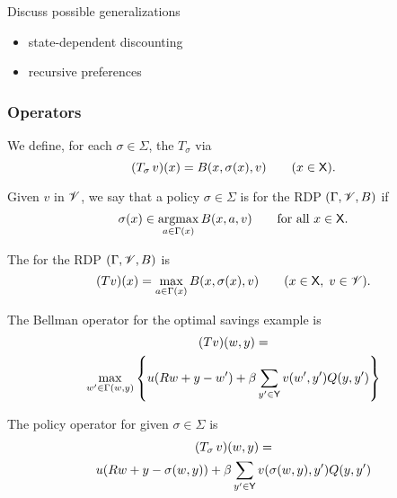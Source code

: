 \begin{frame}
    
    Discuss possible generalizations

    \begin{itemize}
        \item state-dependent discounting
        \item recursive preferences
    \end{itemize}
     
\end{frame}


\begin{frame}
    \frametitle{Operators}

    We define, for each $\sigma \in \Sigma$, the 
    $T_\sigma$ via
    \begin{equation*}
        (T_\sigma \, v)(x) = B(x, \sigma(x), v)
        \qquad (x \in \mathsf X).
    \end{equation*}


    Given $v$ in $\mathscr V$, we say that a policy $\sigma \in \Sigma$ is
     for the RDP $(\Gamma, \mathscr V, B)$ if 
    \begin{equation*}
        \sigma(x) \in \argmax_{a \in \Gamma(x)} B(x, a, v)
        \qquad \text{for all } x \in \Xsf.
    \end{equation*}

    The  for the RDP $(\Gamma, \mathscr V, B)$ is
    \begin{equation*}
        (T v)(x) = \max_{a \in \Gamma(x)} B(x, \sigma(x), v)
        \qquad (x \in \mathsf X, \; v \in \mathscr V).
    \end{equation*}

\end{frame}


\begin{frame}

    \Eg The Bellman operator for the optimal savings example is
    \begin{multline*}
        (Tv)(w, y) = 
        \\
        \max_{w' \in \Gamma(w, y)}
        \left\{
            u(R w + y - w')
            + \beta \sum_{y' \in \mathsf Y} v(w', y') Q(y, y')
        \right\}
    \end{multline*}
    
        \vspace{0.5em}
        \vspace{0.5em}

    The policy operator for given $\sigma \in \Sigma$ is 
    \begin{multline*}
        (T_\sigma \, v)(w, y) = 
        \\
        u(R w + y - \sigma(w, y))
            + \beta \sum_{y' \in \mathsf Y} v(\sigma(w, y), y') Q(y, y')
    \end{multline*}

\end{frame}


